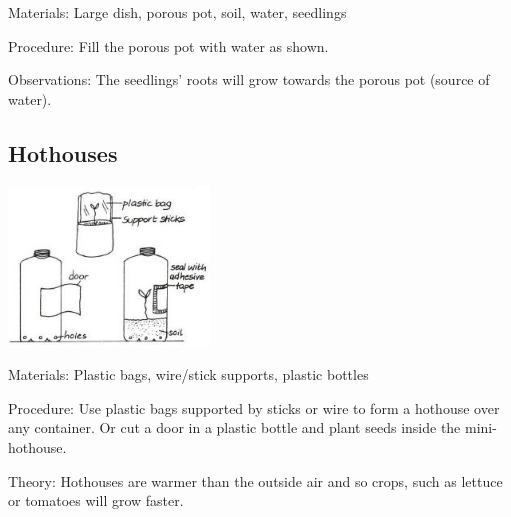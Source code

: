 \begin{multicols}{2}
\begin{description*}
\item[Materials:]{Large dish, porous pot, soil, water, seedlings}
\item[Procedure:]{Fill the porous pot with water as shown.}
\item[Observations:]{The seedlings' roots will grow
towards the porous pot (source of water).}
\end{description*}

\subsection{Hothouses}

\begin{center}
\includegraphics[width=0.4\textwidth]{./img/vso/hothouses.jpg}
\end{center}

\begin{description*}
\item[Materials:]{Plastic bags, wire/stick supports, plastic bottles}
\item[Procedure:]{Use plastic bags supported by
sticks or wire to form a hothouse
over any container. Or cut a door in a plastic bottle and
plant seeds inside the mini-hothouse.}
\item[Theory:]{Hothouses are warmer than the
outside air and so crops, such as
lettuce or tomatoes will grow
faster.}
\end{description*}



\end{multicols}

\pagebreak